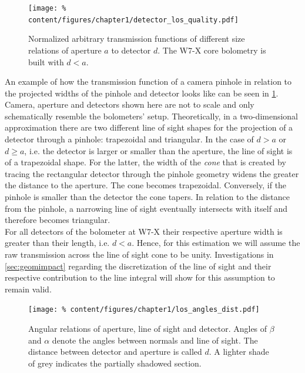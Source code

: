 %
            \begin{figure}[t]%
                \centering%
                \texttt{[image: \%
                    content/figures/chapter1/detector\_los\_quality.pdf]}%
                \caption{Normalized arbitrary transmission functions of different size relations of aperture $a$ to detector $d$. The W7-X core bolometry is built with $d<a$.}\label{fig:transmission}%
            \end{figure}%
%
            An example of how the transmission function of a camera pinhole in relation to the projected widths of the pinhole and detector looks like can be seen in \cref{fig:transmission}. Camera, aperture and detectors shown here are not to scale and only schematically resemble the bolometers' setup. Theoretically, in a two-dimensional approximation there are two different line of sight shapes for the projection of a detector through a pinhole: trapezoidal and triangular. In the case of $d>a$ or $d\ge a$, i.e. the detector is larger or smaller than the aperture, the line of sight is of a trapezoidal shape. For the latter, the width of the \textit{cone} that is created by tracing the rectangular detector through the pinhole geometry widens the greater the distance to the aperture. The cone becomes trapezoidal. Conversely, if the pinhole is smaller than the detector the cone tapers. In relation to the distance from the pinhole, a narrowing line of sight eventually intersects with itself and therefore becomes triangular.\\%
            For all detectors of the bolometer at W7-X their respective aperture width is greater than their length, i.e. $d<a$. Hence, for this estimation we will assume the raw transmission across the line of sight cone to be unity. Investigations in \cref{sec:geomimpact} regarding the discretization of the line of sight and their respective contribution to the line integral will show for this assumption to remain valid.\\%
%
            \begin{figure}[t]%
                \centering%
                \texttt{[image: \%
                    content/figures/chapter1/los\_angles\_dist.pdf]}%
                \caption{Angular relations of aperture, line of sight and detector. Angles of $\beta$ and $\alpha$ denote the angles between normals and line of sight. The distance between detector and aperture is called $d$. A lighter shade of grey indicates the partially shadowed section.}\label{fig:etendue}
            \end{figure}%
